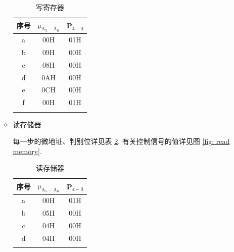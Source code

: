 \documentclass[../main.tex]{subfiles}
\begin{document}
\begin{enumerate}
\begin{itemize}
                    \begin{table}[p]
                        \centering
                        \begin{tabular}{ccc}
                            \Xhline{1pt}
                            序号 & $\mathrm{\mu_{A_{5}-A_{0}}}$ & P$_{4-0}$ \\ \hline
                            a  & 00H                          & 01H       \\
                            b  & 09H                          & 00H       \\
                            c  & 08H                          & 00H       \\
                            d  & 0AH                          & 00H       \\
                            e  & 0CH                          & 00H       \\
                            f  & 00H                          & 01H       \\ \Xhline{1pt}
                        \end{tabular}
                        \caption{写寄存器}
                        \label{tab: write register}
                    \end{table}

              \item 读存储器

                    每一步的微地址、判别位详见表 \ref{tab: read memory}, 有关控制信号的值详见图 \ref{fig: read memory}.

                    \begin{table}[p]
                        \centering
                        \begin{tabular}{ccc}
                            \Xhline{1pt}
                            序号 & $\mathrm{\mu_{A_{5}-A_{0}}}$ & P$_{4-0}$ \\ \hline
                            a  & 00H                          & 01H       \\
                            b  & 05H                          & 00H       \\
                            c  & 04H                          & 00H       \\
                            d  & 04H                          & 00H       \\ \Xhline{1pt}
                        \end{tabular}
                        \caption{读存储器}
                        \label{tab: read memory}
                    \end{table}


\end{itemize}
\end{enumerate}
\end{document}
